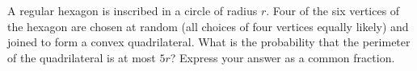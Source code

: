 A regular hexagon is inscribed in a circle of radius $r$. Four of the six vertices of the hexagon are chosen at random (all choices of four vertices equally likely) and joined to form a convex quadrilateral. What is the probability that the perimeter of the quadrilateral is at most $5r$? Express your answer as a common fraction.
